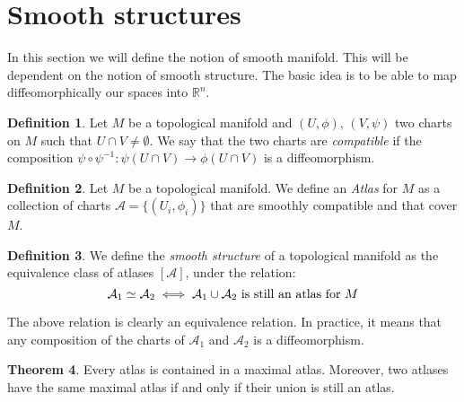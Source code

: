\documentclass[12pt,a4paper]{report}
\theoremstyle{definition}
\newtheorem{Def}{Definition}[chapter]
\theoremstyle{Theorem}
\newtheorem{Theo}[Def]{Theorem}
\theoremstyle{definition}
\theoremstyle{definition}
\begin{document}
		\section{Smooth structures}
		In this section we will define the notion of smooth manifold. This will be dependent on the notion of smooth structure. The basic idea is to be able to map diffeomorphically our spaces into $\mathbb{R}^n$.
		\begin{Def}
			Let $M$ be a topological manifold and $(U,\phi)$, $(V,\psi)$ two charts on $M$ such that $U\cap V\neq \emptyset$. We say that the two charts are \textit{compatible} if the composition $\psi\circ \psi^{-1}:\psi(U\cap V)\longrightarrow \phi(U\cap V)$ is a diffeomorphism.
		\end{Def}
		\begin{Def}
			Let $M$ be a topological manifold. We define an \textit{Atlas} for $M$ as a collection of charts $\mathcal{A}=\{(U_i,\phi_i)\}$ that are smoothly compatible and that cover $M$.
		\end{Def}
		\begin{Def}
			We define the \textit{smooth structure} of a topological manifold as the equivalence class of atlases $[\mathcal{A}]$, under the relation:
			$$\mathcal{A}_1\simeq \mathcal{A}_2\iff \mathcal{A}_1\cup \mathcal{A}_2 \hbox{ is still an atlas for }M$$
		\end{Def}
		The above relation is clearly an equivalence relation. In practice, it means that any composition of the charts of $\mathcal{A}_1$ and $\mathcal{A}_2$ is a diffeomorphism.
		\begin{Theo}
			Every atlas is contained in a maximal atlas. Moreover, two atlases have the same maximal atlas if and only if their union is still an atlas.
		\end{Theo} 
\end{document}
